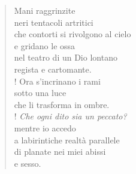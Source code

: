 
\begin{verse}
    Mani raggrinzite\\
    neri tentacoli artritici\\
    che contorti si rivolgono al cielo\\
    e gridano le ossa\\
    nel teatro di un Dio lontano\\
    regista e cartomante.\\!
    Ora s'incrinano i rami\\
    sotto una luce\\
    che li trasforma in ombre.\\!
    \textit{Che ogni dito sia un peccato?}\\
    mentre io accedo\\
    a labirintiche realtà parallele\\
    di planate nei miei abissi\\
    e sesso.
\end{verse}